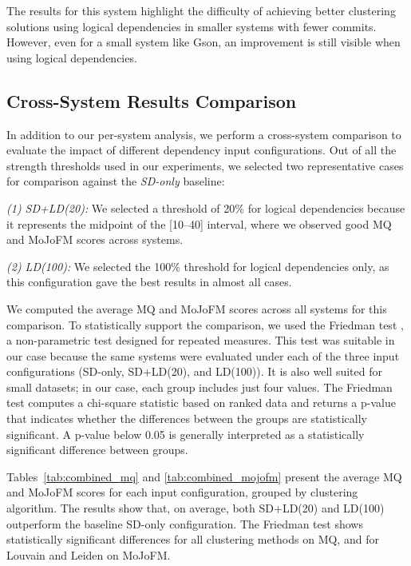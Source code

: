 \documentclass{ieeeaccess}
\begin{document}
The results for this system highlight the difficulty of achieving better clustering solutions using logical dependencies in smaller systems with fewer commits. However, even for a small system like Gson, an improvement is still visible when using logical dependencies.

\subsection{Cross-System Results Comparison}

In addition to our per-system analysis, we perform a cross-system comparison to evaluate the impact of different dependency input configurations. Out of all the strength thresholds used in our experiments, we selected two representative cases for comparison against the \textit{SD-only} baseline:

\textit{(1) SD+LD(20):} We selected a threshold of 20\% for logical dependencies because it represents the midpoint of the [10--40] interval, where we observed good MQ and MoJoFM scores across systems.

\textit{(2) LD(100):} We selected the 100\% threshold for logical dependencies only, as this configuration gave the best results in almost all cases.

We computed the average MQ and MoJoFM scores across all systems for this comparison. To statistically support the comparison, we used the Friedman test \cite{friedman}, a non-parametric test designed for repeated measures. This test was suitable in our case because the same systems were evaluated under each of the three input configurations (SD-only, SD+LD(20), and LD(100)). It is also well suited for small datasets; in our case, each group includes just four values. The Friedman test computes a chi-square statistic based on ranked data and returns a p-value that indicates whether the differences between the groups are statistically significant. A p-value below 0.05 is generally interpreted as a statistically significant difference between groups.

Tables~\ref{tab:combined_mq} and \ref{tab:combined_mojofm} present the average MQ and MoJoFM scores for each input configuration, grouped by clustering algorithm. The results show that, on average, both SD+LD(20) and LD(100) outperform the baseline SD-only configuration. The Friedman test shows statistically significant differences for all clustering methods on MQ, and for Louvain and Leiden on MoJoFM.
\end{document}
